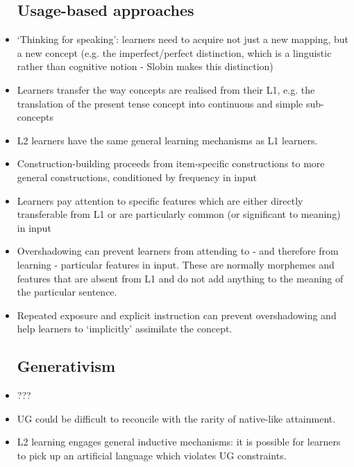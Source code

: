 \documentclass{article}
\begin{document}
\begin{itemize}
\subsection{Usage-based approaches}
    \item `Thinking for speaking': learners need to acquire not just a new mapping, but a new concept (e.g. the imperfect/perfect distinction, which is a linguistic rather than cognitive notion - Slobin makes this distinction)
    \item Learners transfer the way concepts are realised from their L1, e.g. the translation of the present tense concept into continuous and simple sub-concepts
    \item L2 learners have the same general learning mechanisms as L1 learners.
    \item Construction-building proceeds from item-specific constructions to more general constructions, conditioned by frequency in input
    \item Learners pay attention to specific features which are either directly transferable from L1 or are particularly common (or significant to meaning) in input
    \item Overshadowing can prevent learners from attending to - and therefore from learning - particular features in input. These are normally morphemes and features that are absent from L1 and do not add anything to the meaning of the particular sentence.
    \item Repeated exposure and explicit instruction can prevent overshadowing and help learners to `implicitly' assimilate the concept.
\subsection{Generativism}
    \item ???
    \item UG could be difficult to reconcile with the rarity of native-like attainment. 
    \item L2 learning engages general inductive mechanisms: it is possible for learners to pick up an artificial language which violates UG constraints.
\end{itemize}
\end{document}
